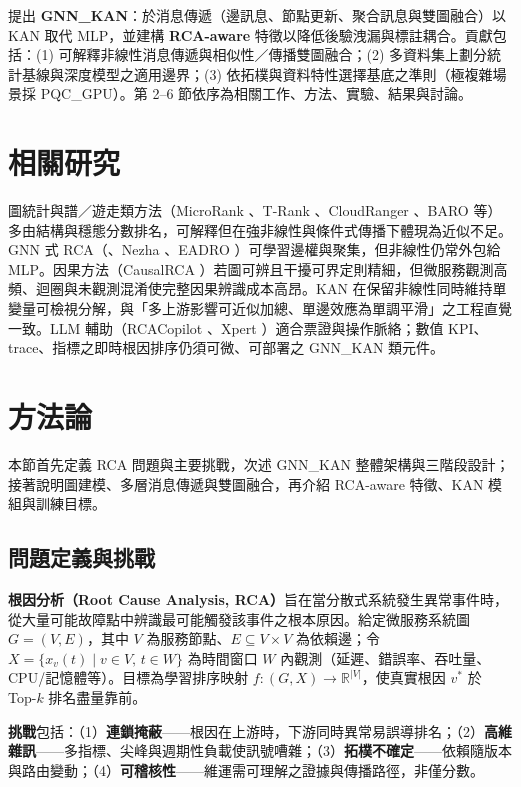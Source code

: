 \documentclass[conference]{IEEEtran}
\begin{document}
提出 \textbf{GNN\_KAN}：於消息傳遞（邊訊息、節點更新、聚合訊息與雙圖融合）以 KAN 取代 MLP，並建構 \textbf{RCA-aware} 特徵以降低後驗洩漏與標註耦合。貢獻包括：(1) 可解釋非線性消息傳遞與相似性／傳播雙圖融合；(2) 多資料集上劃分統計基線與深度模型之適用邊界；(3) 依拓樸與資料特性選擇基底之準則（極複雜場景採 PQC\_GPU）。第 2--6 節依序為相關工作、方法、實驗、結果與討論。

\section{相關研究}

圖統計與譜／遊走類方法（MicroRank \cite{microrank2021}、T-Rank \cite{trank2021}、CloudRanger \cite{cloudranger2018}、BARO \cite{baro2023} 等）多由結構與穩態分數排名，可解釋但在強非線性與條件式傳播下體現為近似不足。GNN 式 RCA（\cite{gnn_rca2023}、Nezha \cite{nezha2023}、EADRO \cite{eadro2023}）可學習邊權與聚集，但非線性仍常外包給 MLP。因果方法（CausalRCA \cite{causalrca2023}）若圖可辨且干擾可界定則精細，但微服務觀測高頻、迴圈與未觀測混淆使完整因果辨識成本高昂。KAN \cite{kan2024,kolmogorov1957} 在保留非線性同時維持單變量可檢視分解，與「多上游影響可近似加總、單邊效應為單調平滑」之工程直覺一致。LLM 輔助（RCACopilot \cite{rcacopilot2024}、Xpert \cite{xpert2024}）適合票證與操作脈絡；數值 KPI、trace、指標之即時根因排序仍須可微、可部署之 GNN\_KAN 類元件。

\section{方法論}

本節首先定義 RCA 問題與主要挑戰，次述 GNN\_KAN 整體架構與三階段設計；接著說明圖建模、多層消息傳遞與雙圖融合，再介紹 RCA-aware 特徵、KAN 模組與訓練目標。

\subsection{問題定義與挑戰}

\textbf{根因分析（Root Cause Analysis, RCA）}旨在當分散式系統發生異常事件時，從大量可能故障點中辨識最可能觸發該事件之根本原因。給定微服務系統圖 $G=(V, E)$，其中 $V$ 為服務節點、$E \subseteq V \times V$ 為依賴邊；令 $X = \{x_v(t) \mid v \in V,\, t \in W\}$ 為時間窗口 $W$ 內觀測（延遲、錯誤率、吞吐量、CPU/記憶體等）。目標為學習排序映射 $f:(G,X)\to\mathbb{R}^{|V|}$，使真實根因 $v^*$ 於 Top-$k$ 排名盡量靠前。

\textbf{挑戰}包括：（1）\textbf{連鎖掩蔽}——根因在上游時，下游同時異常易誤導排名；（2）\textbf{高維雜訊}——多指標、尖峰與週期性負載使訊號嘈雜；（3）\textbf{拓樸不確定}——依賴隨版本與路由變動；（4）\textbf{可稽核性}——維運需可理解之證據與傳播路徑，非僅分數。
\end{document}
